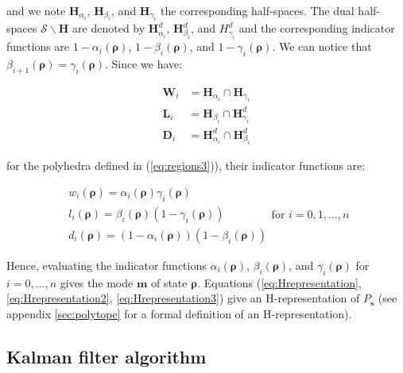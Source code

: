 \documentclass[11pt]{article}
\numberwithin{equation}{section}
\numberwithin{figure}{section}
\numberwithin{table}{section}
\begin{document}
\noindent and we note $\textbf{H}_{\alpha_{i}}$, $\textbf{H}_{\beta_{i}}$, and $\textbf{H}_{\gamma_{i}}$ the corresponding half-spaces. The dual half-spaces $\mathcal{S}\backslash \textbf{H}$ are denoted by $\textbf{H}^{d}_{\alpha_{i}}$, $\textbf{H}^{d}_{\beta_{i}}$, and $H^{d}_{\gamma_{i}}$ and the corresponding indicator functions are $1-\alpha_{i}(\boldsymbol\rho)$, $1-\beta_{i}(\boldsymbol\rho)$, and $1-\gamma_{i}(\boldsymbol\rho)$. We can notice that $\beta_{i+1}(\boldsymbol\rho)=\gamma_{i}(\boldsymbol\rho)$. Since we have:

\begin{equation}
\begin{array}{ll}
\textbf{W}_{i}&=\textbf{H}_{\alpha_{i}}\cap \textbf{H}_{\gamma_{i}}\\
\textbf{L}_{i}&=\textbf{H}_{\beta_{i}}\cap \textbf{H}^{d}_{\gamma_{i}}\\
\textbf{D}_{i}&=\textbf{H}^{d}_{\alpha_{i}}\cap \textbf{H}^{d}_{\beta_{i}}
\end{array}
\label{eq:Hrepresentation3}
\end{equation}

\noindent for the polyhedra defined in (\ref{eq:regions3})), their indicator functions are:

\begin{equation}
\begin{array}{l}
w_{i}(\boldsymbol\rho)=\alpha_{i}(\boldsymbol\rho)\gamma_{i}(\boldsymbol\rho)\\
l_{i}(\boldsymbol\rho)=\beta_{i}(\boldsymbol\rho)(1-\gamma_{i}(\boldsymbol\rho))\\
d_{i}(\boldsymbol\rho)=(1-\alpha_{i}(\boldsymbol\rho))(1-\beta_{i}(\boldsymbol\rho))
\end{array}
\text{for }i=0,1,...,n
\label{eq:indicators2}
\end{equation}

Hence, evaluating the indicator functions $\alpha_{i}(\boldsymbol\rho)$, $\beta_{i}(\boldsymbol\rho)$, and $\gamma_{i}(\boldsymbol\rho)$ for $i=0,...,n$ gives the mode $\boldsymbol m$ of state $\boldsymbol\rho$. Equations (\ref{eq:Hrepresentation}, \ref{eq:Hrepresentation2}, \ref{eq:Hrepresentation3}) give an H-representation of $P_{\boldsymbol s}$ (see appendix \ref{sec:polytope} for a formal definition of an H-representation).


\subsection{Kalman filter algorithm}
\end{document}
